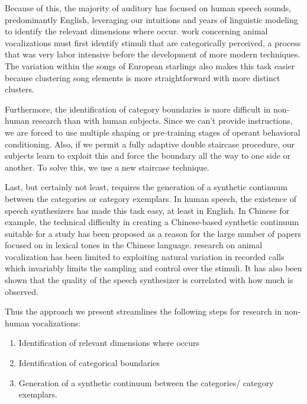 Because of this, the majority of auditory \CP has focused on human speech sounds, predominantly English, leveraging our intuitions and years of linguistic modeling to identify the relevant dimensions where \CP occur. \CP work concerning animal vocalizations must first identify stimuli that are categorically perceived, a process that was very labor intensive\cite{nelson1989categorical,prather2009neural,lachlan2015context} before the development of more modern techniques\cite{sainburg2019parallels}. The variation within the songs of European starlings also makes this task easier because clustering song elements is more straightforward with more distinct clusters.

Furthermore, the identification of category boundaries is more difficult in non-human research than with human subjects. Since we can't provide instructions, we are forced to use multiple shaping or pre-training stages of operant behavioral conditioning. Also, if we permit a fully adaptive double staircase procedure, our subjects learn to exploit this and force the boundary all the way to one side or another. To solve this, we use a new staircase technique.

Last, but certainly not least, \CP requires the generation of a synthetic continuum between the categories or category exemplars. In human speech, the existence of speech synthesizers has made this task easy, at least in English. In Chinese for example, the technical difficulty in creating a Chinese-based synthetic continuum suitable for a \CP study has been proposed as a reason for the large number of papers focused on \CP in lexical tones in the Chinese language\cite{zhang2013categorical}. \CP research on animal vocalization has been limited to exploiting natural variation in recorded calls\cite{nelson1989categorical,prather2009neural,lachlan2015context} which invariably limits the sampling and control over the stimuli. It has also been shown that the quality of the speech synthesizer is correlated with how much \CP is observed\cite{van1999categorical}.

Thus the approach we present streamlines the following steps for \CP research in non-human vocalizations:
\begin{enumerate}
    \item Identification of relevant dimensions where \CP occurs
    \item Identification of categorical boundaries
    \item Generation of a synthetic continuum between the categories/ category exemplars.
\end{enumerate}